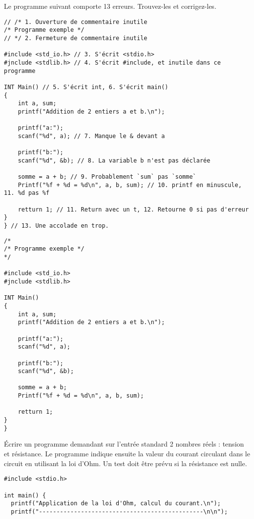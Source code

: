 \documentclass[french,a4paper,addpoints,11pt]{exam}
\begin{document}
\begin{questions}
\question Le programme suivant comporte 13 erreurs. Trouvez-les et corrigez-les.



\ifprintanswers
\begin{solution}
\begin{lstlisting}
// /* 1. Ouverture de commentaire inutile
/* Programme exemple */
// */ 2. Fermeture de commentaire inutile

#include <std_io.h> // 3. S'écrit <stdio.h>
#jnclude <stdlib.h> // 4. S'écrit #include, et inutile dans ce programme

INT Main() // 5. S'écrit int, 6. S'écrit main()
{
    int a, sum;
    printf("Addition de 2 entiers a et b.\n");

    printf("a:");
    scanf("%d", a); // 7. Manque le & devant a

    printf("b:");
    scanf("%d", &b); // 8. La variable b n'est pas déclarée

    somme = a + b; // 9. Probablement `sum` pas `somme`
    Printf("%f + %d = %d\n", a, b, sum); // 10. printf en minuscule, 11. %d pas %f

    retturn 1; // 11. Return avec un t, 12. Retourne 0 si pas d'erreur
}
} // 13. Une accolade en trop.
\end{lstlisting}
\end{solution}
\else
\begin{lstlisting}
/*
/* Programme exemple */
*/

#include <std_io.h>
#jnclude <stdlib.h>

INT Main()
{
    int a, sum;
    printf("Addition de 2 entiers a et b.\n");

    printf("a:");
    scanf("%d", a);

    printf("b:");
    scanf("%d", &b);

    somme = a + b;
    Printf("%f + %d = %d\n", a, b, sum);

    retturn 1;
}
}
\end{lstlisting}
\fi

\newpage
\question Écrire un programme demandant sur l'entrée standard 2 nombres réels : tension et résistance. Le programme indique ensuite la valeur du courant circulant dans le circuit en utilisant la loi d'Ohm. Un test doit être prévu si la résistance est nulle.

\ifprintanswers
\begin{solution}
\begin{lstlisting}
#include <stdio.h>

int main() {
  printf("Application de la loi d'Ohm, calcul du courant.\n");
  printf("-----------------------------------------------\n\n");


\end{lstlisting}
\end{solution}
\end{questions}
\end{document}
